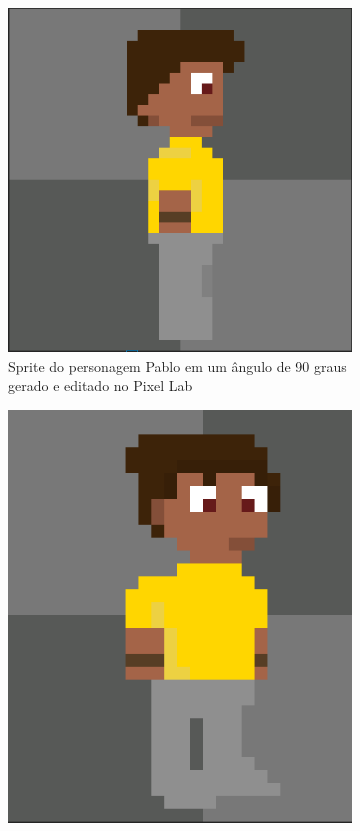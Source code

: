 \begin{figure}[htbp]
\begin{subfigure}{0.32\linewidth}
        \includegraphics[width=1\linewidth]{figs/pixelLab/dia2/fix_init_1.PNG}
        \caption{\small Sprite do personagem Pablo em um ângulo de 90 graus gerado e editado no Pixel Lab}
        \label{fig:chatGPTPablo90}
    \end{subfigure}
    \begin{subfigure}{0.32\linewidth}
        \centering
        \includegraphics[width=1\linewidth]{figs/pixelLab/dia2/fix_teste_3.PNG}

\end{subfigure}
\end{figure}

